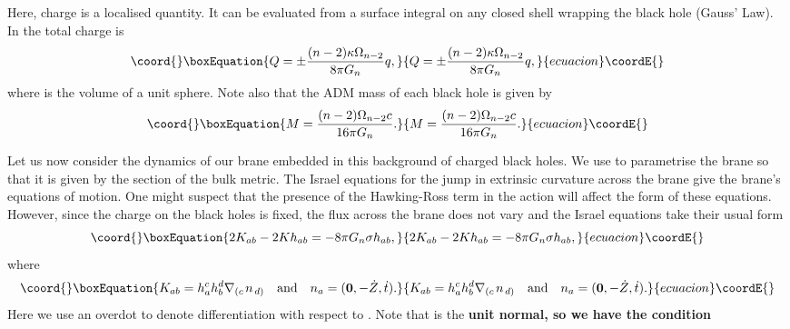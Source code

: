 \documentclass[a4paper,12pt]{article}
\begin{document}
Here, charge is a localised quantity. It can be evaluated from a
surface integral on any closed shell wrapping the black hole (Gauss'
Law). In \coordHE{} the total charge is
\begin{equation}\coord{}\boxEquation{
Q=\pm \frac{(n-2)\kappa \Omega_{n-2}}{8\pi G_n} q,
}{
Q=\pm \frac{(n-2)\kappa \Omega_{n-2}}{8\pi G_n} q,
}{ecuacion}\coordE{}\end{equation}  
where \coordHE{} is the volume of a unit \coordHE{} sphere. Note also
that the ADM mass \cite{Hawking:adsblackholes} of each black hole is
given by
\begin{equation}\coord{}\boxEquation{
M=\frac{(n-2)\Omega_{n-2}c}{16 \pi G_n}.
}{
M=\frac{(n-2)\Omega_{n-2}c}{16 \pi G_n}.
}{ecuacion}\coordE{}\end{equation}

Let us now consider the dynamics of our brane embedded in this
background of charged black holes. We use \myHighlight{$\tau$}\coordHE{} to parametrise the
brane so that it is given by the section \coordHE{} of the bulk metric.  The Israel equations for the
jump in extrinsic curvature across the brane give the brane's
equations of motion. One might suspect that the presence  of the
Hawking-Ross term in the action will affect the form of these
equations. However, since the charge on the black holes is fixed, the
flux across the brane does not vary and the Israel equations take
their usual form
\begin{equation}\coord{}\boxEquation{
2K_{ab} - 2K h_{ab} = -8\pi G_n \sigma h_{ab},
}{
2K_{ab} - 2K h_{ab} = -8\pi G_n \sigma h_{ab},
}{ecuacion}\coordE{}\end{equation}
where
\begin{equation}\coord{}\boxEquation{
K_{ab} = h_{a}^c h_{b}^d \nabla_{\left(c\right.}n_{\left.d\right)}
\quad \textrm{and} \quad n_a=({\bf 0}, -\dot{Z},\dot{t}).
}{
K_{ab} = h_{a}^c h_{b}^d \nabla_{\left(c\right.}n_{\left.d\right)}
\quad \textrm{and} \quad n_a=({\bf 0}, -\dot{Z},\dot{t}).
}{ecuacion}\coordE{}\end{equation}
Here we use an overdot to denote differentiation with respect to
\myHighlight{$\tau$}\coordHE{}.  Note that \coordHE{} is the \bf{unit} \rm normal, so we have the
condition
\end{document}
